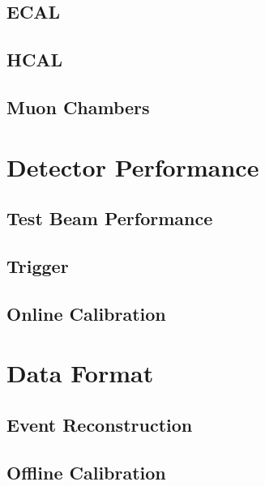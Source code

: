 \subsection{ECAL}

\subsection{HCAL}

\subsection{Muon Chambers}

\section{Detector Performance}

\subsection{Test Beam Performance}

\subsection{Trigger}

\subsection{Online Calibration}

\section{Data Format}

\subsection{Event Reconstruction} \label{sec:event-reco}

\subsection{Offline Calibration}
